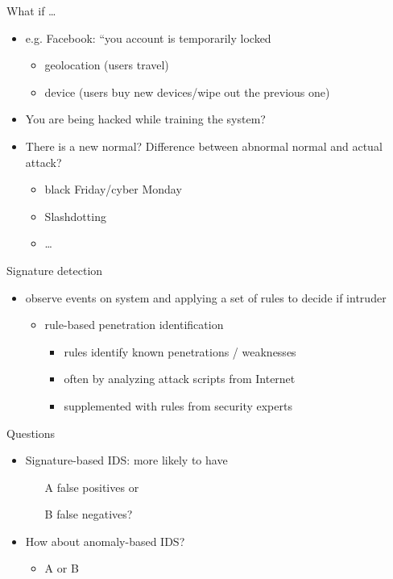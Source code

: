 \documentclass{beamer}
\begin{document}
\begin{frame}{What if \dots}
  \begin{itemize}
  \item e.g. Facebook: ``you account is temporarily locked
    \begin{itemize}
      \item geolocation (users travel)
      \item device (users buy new devices/wipe out the previous one)
    \end{itemize}
  \item You are being hacked while training the 
    system? 
  \item There is a new normal? Difference between 
    abnormal normal and actual attack?
    \begin{itemize}
      \item black Friday/cyber Monday
      \item Slashdotting
      \item \dots
    \end{itemize}
  \end{itemize}
\end{frame}

\begin{frame}{Signature detection}
  \begin{itemize}
  \item observe events on system and applying a set of 
    rules to decide if intruder 
    \begin{itemize}
    \item rule-based penetration identification 
      \begin{itemize}
      \item rules identify known penetrations / weaknesses 
      \item often by analyzing attack scripts from Internet 
      \item supplemented with rules from security experts 
      \end{itemize}
    \end{itemize}
  \end{itemize}
\end{frame}

\begin{frame}{Questions}
  \begin{itemize}
  \item Signature-based IDS: more likely to have 
    \begin{itemize}
    \item[A] false positives or 
    \item[B] false negatives? 
    \end{itemize}
  \item How about anomaly-based IDS? 
    \begin{itemize}
      \item A or B 
    \end{itemize}
  \end{itemize}
\end{frame}
\end{document}

